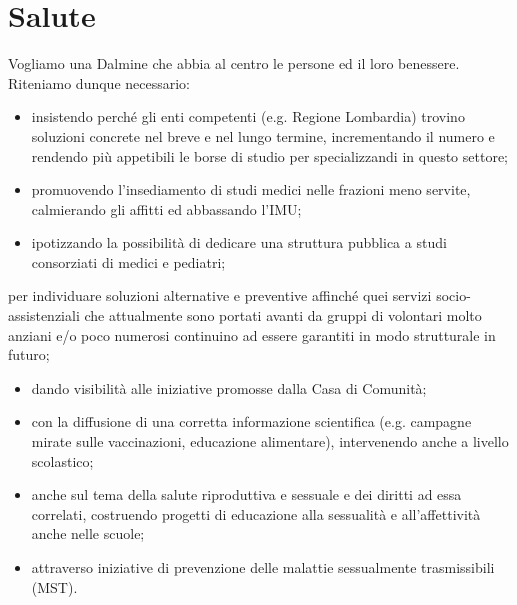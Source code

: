 \section{Salute}
Vogliamo una Dalmine che abbia al centro le persone ed il loro benessere. Riteniamo dunque necessario:

\begin{bluebox}
\begin{itemize}
  \item insistendo perché gli enti competenti (e.g. Regione Lombardia) trovino soluzioni concrete nel breve e nel lungo termine, incrementando il numero e rendendo più appetibili le borse di studio per specializzandi in questo settore;
  \item promuovendo l'insediamento di studi medici nelle frazioni meno servite, calmierando gli affitti ed abbassando l'IMU;
  \item ipotizzando la possibilità di dedicare una struttura pubblica a studi consorziati di medici e pediatri;
\end{itemize}
\end{bluebox}

 per individuare soluzioni alternative e preventive affinché quei servizi socio-assistenziali che attualmente sono portati avanti da gruppi di volontari molto anziani e/o poco numerosi continuino ad essere garantiti in modo strutturale in futuro;

\begin{itemize}
  \item dando visibilità alle iniziative promosse dalla Casa di Comunità;
  \item con la diffusione di una corretta informazione scientifica (e.g. campagne mirate sulle vaccinazioni, educazione alimentare), intervenendo anche a livello scolastico; 
  \item anche sul tema della salute riproduttiva e sessuale e dei diritti ad essa correlati, costruendo  progetti di educazione alla sessualità e all'affettività anche nelle scuole;
  \item attraverso iniziative di prevenzione delle malattie sessualmente trasmissibili (MST).
\end{itemize}

